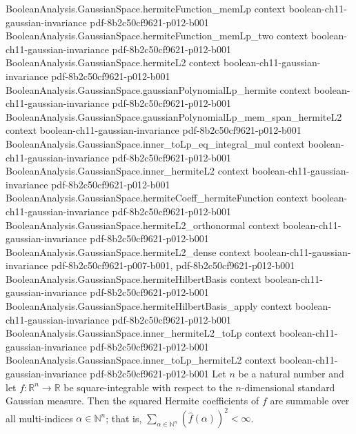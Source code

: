 \begin{lemma}
\proofstep
  {BooleanAnalysis.GaussianSpace.hermiteFunction_memLp}
  {context}
  {boolean-ch11-gaussian-invariance}
  {pdf-8b2c50cf9621-p012-b001}
\proofstep
  {BooleanAnalysis.GaussianSpace.hermiteFunction_memLp_two}
  {context}
  {boolean-ch11-gaussian-invariance}
  {pdf-8b2c50cf9621-p012-b001}
\proofstep
  {BooleanAnalysis.GaussianSpace.hermiteL2}
  {context}
  {boolean-ch11-gaussian-invariance}
  {pdf-8b2c50cf9621-p012-b001}
\proofstep
  {BooleanAnalysis.GaussianSpace.gaussianPolynomialLp_hermite}
  {context}
  {boolean-ch11-gaussian-invariance}
  {pdf-8b2c50cf9621-p012-b001}
\proofstep
  {BooleanAnalysis.GaussianSpace.gaussianPolynomialLp_mem_span_hermiteL2}
  {context}
  {boolean-ch11-gaussian-invariance}
  {pdf-8b2c50cf9621-p012-b001}
\proofstep
  {BooleanAnalysis.GaussianSpace.inner_toLp_eq_integral_mul}
  {context}
  {boolean-ch11-gaussian-invariance}
  {pdf-8b2c50cf9621-p012-b001}
\proofstep
  {BooleanAnalysis.GaussianSpace.inner_hermiteL2}
  {context}
  {boolean-ch11-gaussian-invariance}
  {pdf-8b2c50cf9621-p012-b001}
\proofstep
  {BooleanAnalysis.GaussianSpace.hermiteCoeff_hermiteFunction}
  {context}
  {boolean-ch11-gaussian-invariance}
  {pdf-8b2c50cf9621-p012-b001}
\proofstep
  {BooleanAnalysis.GaussianSpace.hermiteL2_orthonormal}
  {context}
  {boolean-ch11-gaussian-invariance}
  {pdf-8b2c50cf9621-p012-b001}
\proofstep
  {BooleanAnalysis.GaussianSpace.hermiteL2_dense}
  {context}
  {boolean-ch11-gaussian-invariance}
  {pdf-8b2c50cf9621-p007-b001,
    pdf-8b2c50cf9621-p012-b001}
\proofstep
  {BooleanAnalysis.GaussianSpace.hermiteHilbertBasis}
  {context}
  {boolean-ch11-gaussian-invariance}
  {pdf-8b2c50cf9621-p012-b001}
\proofstep
  {BooleanAnalysis.GaussianSpace.hermiteHilbertBasis_apply}
  {context}
  {boolean-ch11-gaussian-invariance}
  {pdf-8b2c50cf9621-p012-b001}
\proofstep
  {BooleanAnalysis.GaussianSpace.inner_hermiteL2_toLp}
  {context}
  {boolean-ch11-gaussian-invariance}
  {pdf-8b2c50cf9621-p012-b001}
\proofstep
  {BooleanAnalysis.GaussianSpace.inner_toLp_hermiteL2}
  {context}
  {boolean-ch11-gaussian-invariance}
  {pdf-8b2c50cf9621-p012-b001}
Let $n$ be a natural number and let $f:\mathbb R^n\to\mathbb R$ be square-integrable
with respect to the $n$-dimensional standard Gaussian measure. Then the squared Hermite
coefficients of $f$ are summable over all multi-indices $\alpha\in\mathbb N^n$; that is,
$\sum_{\alpha\in\mathbb N^n}(\widehat f(\alpha))^2<\infty$.
\end{lemma}

